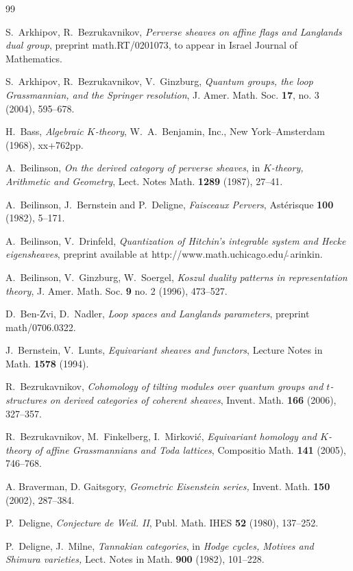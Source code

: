\documentclass[11pt]{amsart}
\theoremstyle{definition}
\theoremstyle{remark}
\theoremstyle{remark}
\newcommand{\<}{\langle}
\renewcommand{\>}{\rangle}
\begin{document}
\begin{thebibliography}{99}

 S.~Arkhipov, R.~Bezrukavnikov, {\em Perverse sheaves on
affine flags and Langlands dual group}, preprint math.RT/0201073,
to appear in Israel Journal of Mathematics.

 S.~Arkhipov, R.~Bezrukavnikov, V.~Ginzburg, 
{\em Quantum groups, the loop Grassmannian, and the Springer
  resolution}, J. Amer. Math. Soc. {\bf 17}, no. 3 (2004), 595--678. 

 H.~Bass, {\em Algebraic $K$-theory}, W.~A.~Benjamin, Inc.,
  New York--Amsterdam (1968), xx+762pp.

 A.~Beilinson, {\em On the derived category of perverse 
sheaves}, in {\em $K$-theory, Arithmetic and Geometry}, Lect. Notes
  Math. {\bf 1289} (1987), 27--41.

 A.~Beilinson, J.~Bernstein and P.~Deligne,
{\em Faisceaux Pervers}, Ast{\'e}risque {\bf 100} (1982), 5--171.

 A.~Beilinson, V.~Drinfeld, {\em Quantization of Hitchin's
integrable system and Hecke eigensheaves}, preprint available at
http://www.math.uchicago.edu/$\tilde{\ }$arinkin.

 A.~Beilinson, V.~Ginzburg, W.~Soergel, 
{\em Koszul duality patterns in representation theory}, 
J. Amer. Math. Soc. {\bf 9} no. 2 (1996), 473--527.

 D.~Ben-Zvi, D.~Nadler, {\em Loop spaces and Langlands
  parameters}, preprint math/0706.0322.

 J.~Bernstein, V.~Lunts, {\em Equivariant sheaves and
  functors}, Lecture Notes in Math. {\bf 1578} (1994).

 R.~Bezrukavnikov, {\em Cohomology of tilting modules over
quantum groups and $t$-structures on derived categories of coherent
sheaves}, Invent. Math. {\bf 166} (2006), 327--357.

 R.~Bezrukavnikov, M.~Finkelberg, I.~Mirkovi\'c,
{\em Equivariant homology and $K$-theory of affine Grassmannians and
Toda lattices}, Compositio Math. {\bf 141} (2005), 746--768.

 A. Braverman, D. Gaitsgory,
{\em Geometric Eisenstein series,} Invent. Math. {\bf 150}
  (2002), 287--384.


 P.~Deligne, {\em Conjecture de Weil. II},
Publ. Math. IHES {\bf 52} (1980), 137--252.

 P.~Deligne, J.~Milne, {\em Tannakian categories},
in {\em Hodge cycles, Motives and Shimura varieties,}
Lect. Notes in Math. {\bf 900} (1982), 101--228.


\end{thebibliography}
\end{document}
